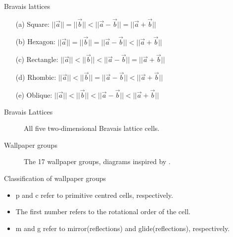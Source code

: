\documentclass{beamer}
\begin{document}
\begin{frame}{Bravais lattices}
    \begin{center}
    \begin{enumerate}
        \item[(a)] Square:\hspace*{14pt} $||\vec{a}||=||\vec{b}|| < ||\vec{a}-\vec{b}|| = ||\vec{a}+\vec{b}||$

        \item[(b)] Hexagon:\hspace*{6pt} $||\vec{a}||=||\vec{b}|| = ||\vec{a}-\vec{b}|| < ||\vec{a}+\vec{b}||$

        \item[(c)] Rectangle: $||\vec{a}||<||\vec{b}|| < ||\vec{a}-\vec{b}|| = ||\vec{a}+\vec{b}||$

        \item[(d)] Rhombic:\hspace*{6pt} $||\vec{a}||<||\vec{b}|| = ||\vec{a}-\vec{b}|| < ||\vec{a}+\vec{b}||$

        \item[(e)] Oblique:\hspace*{11pt} $||\vec{a}||<||\vec{b}|| < ||\vec{a}-\vec{b}|| < ||\vec{a}+\vec{b}||$
    \end{enumerate}
    \end{center}
\end{frame}

\begin{frame}{Bravais Lattices}
    \begin{figure}
        \centering
        
        \caption{All five two‐dimensional Bravais lattice cells.}
        \label{fig:bravis-lattices}
    \end{figure}
\end{frame}



\begin{frame}{Wallpaper groups}
    \begin{figure}
        \centering
        
        \caption{The 17 wallpaper groups, diagrams inspired by \cite{tomruen2011}.}
        \label{fig:17WallpaperGroups}
    \end{figure}
\end{frame}

\begin{frame}{Classification of wallpaper groups}
    \begin{itemize}
        \item p and c refer to primitive centred cells, respectively.
        \item The first number refers to the rotational order of the cell. 
        \item m and g refer to mirror(reflections) and glide(reflections), respectively. 
    \end{itemize}
\end{frame}
\end{document}
